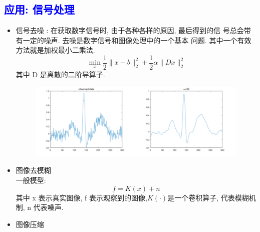 \documentclass[12pt,a4paper]{article}
\begin{document}
\subsection{\textcolor{blue}{应用: 信号处理}}
\begin{itemize}
\item 信号去噪 : 在获取数字信号时, 由于各种各样的原因, 最后得到的信 号总会带有一定的噪声. 去噪是数字信号和图像处理中的一个基本 问题. 其中一个有效方法就是加权最小二乘法.
$$
\min _{x} \frac{1}{2}\|x-b\|_{2}^{2}+\frac{1}{2} \alpha\|D x\|_{2}^{2}
$$
其中 D 是离散的二阶导算子.
\begin{figure}[htbp]
\begin{center}
\includegraphics[scale=1]{figure3.png}
\end{center}
\end{figure}
\item 图像去模糊\\
一般模型:
$$
f=K(x)+n
$$
其中 x 表示真实图像, f 表示观察到的图像,$K(\cdot)$是一个卷积算子, 代表模糊机制, n 代表噪声.
\item 图像压缩
\end{itemize}
\end{document}
